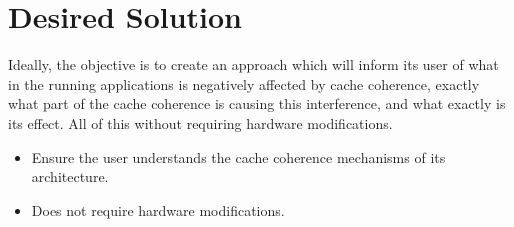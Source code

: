 \section{Desired Solution}
Ideally, the objective is to create an approach which will inform its user of
what in the running applications is negatively affected by cache coherence,
exactly what part of the cache coherence is causing this interference, and what
exactly is its effect. All of this without requiring hardware modifications.

\begin{itemize}
\item Ensure the user understands the cache coherence mechanisms of its
architecture.

\item Does not require hardware modifications.
\end{itemize}

